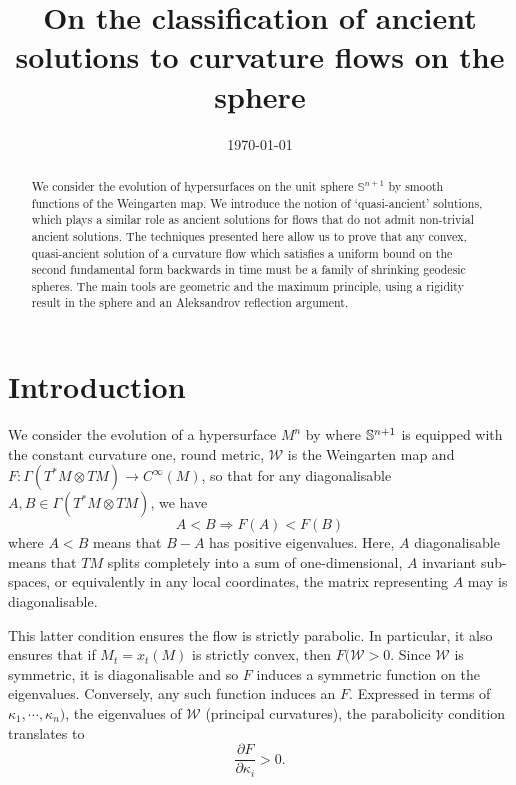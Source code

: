 \documentclass{amsart}
\begin{document}
\title[Ancient solutions to curvature flows in the sphere]
 {On the classification of ancient solutions to curvature flows on the sphere}

\curraddr{}
\email{}
\date{\today}

\dedicatory{}
\subjclass[2010]{}
\keywords{}

\begin{abstract}
We consider the evolution of hypersurfaces on the unit sphere $\mathbb{S}^{n+1}$ by smooth functions of the Weingarten map. We introduce the notion of `quasi-ancient' solutions, which plays a similar role as ancient solutions for flows that do not admit non-trivial ancient solutions. The techniques presented here allow us to prove that any convex, quasi-ancient solution of a curvature flow which satisfies a uniform bound on the second fundamental form backwards in time must be a family of shrinking geodesic spheres. The main tools are geometric and the maximum principle, using a rigidity result in the sphere and an Aleksandrov reflection argument.
\end{abstract}

\maketitle

\section{Introduction}
\label{sec:intro}

We consider the evolution of a hypersurface $M^n$ by
\eq{\label{eq:CurvFlow}
\partial_tx=-F(\mathcal{W})\nu,~ x:M^n\times[0,T)\to \S^{n+1},
}
where \(\S^{n+1}\) is equipped with the constant curvature one, round metric, \(\mathcal{W}\) is the Weingarten map and \(F : \Gamma(T^\ast M \otimes TM) \to C^{\infty}(M)\), so that for any diagonalisable \(A, B \in \Gamma(T^\ast M \otimes TM)\), we have
\[
A < B \Rightarrow F(A) < F(B)
\]
where \(A < B\) means that \(B - A\) has positive eigenvalues. Here, \(A\) diagonalisable means that \(TM\) splits completely into a sum of one-dimensional, \(A\) invariant sub-spaces, or equivalently in any local coordinates, the matrix representing \(A\) may is diagonalisable.

This latter condition ensures the flow is strictly parabolic. In particular, it also ensures that if \(M_t = x_t(M)\) is strictly convex, then \(F(\mathcal{W} > 0\). Since \(\mathcal{W}\) is symmetric, it is diagonalisable and so \(F\) induces a symmetric function on the eigenvalues. Conversely, any such function induces an \(F\). Expressed in terms of \(\kappa_1,\cdots,\kappa_n)\), the eigenvalues of \(\mathcal{W}\) (principal curvatures), the parabolicity condition translates to 
\[
\frac{\partial F}{\partial \kappa_i} > 0.
\]
\end{document}
